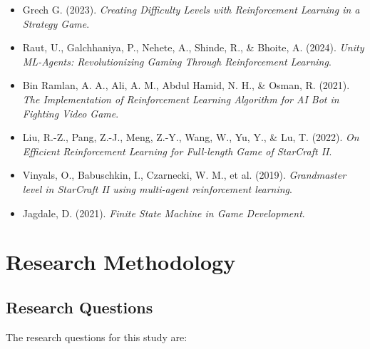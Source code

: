 \documentclass[conference]{IEEEtran}
\begin{document}
\begin{itemize}
	\item Grech G. (2023). \textit{Creating Difficulty Levels with Reinforcement Learning in a Strategy Game}. \cite{grech_creating_2023}
	\item Raut, U., Galchhaniya, P., Nehete, A., Shinde, R., \& Bhoite, A. (2024). \textit{Unity ML-Agents: Revolutionizing Gaming Through Reinforcement Learning}. \cite{raut_unity_2024}
	\item Bin Ramlan, A. A., Ali, A. M., Abdul Hamid, N. H., \& Osman, R. (2021). \textit{The Implementation of Reinforcement Learning Algorithm for AI Bot in Fighting Video Game}. \cite{bin_ramlan_implementation_2021}
	\item Liu, R.-Z., Pang, Z.-J., Meng, Z.-Y., Wang, W., Yu, Y., \& Lu, T. (2022). \textit{On Efficient Reinforcement Learning for Full-length Game of StarCraft II}. \cite{liu_efficient_2022}
	\item Vinyals, O., Babuschkin, I., Czarnecki, W. M., et al. (2019). \textit{Grandmaster level in StarCraft II using multi-agent reinforcement learning}. \cite{vinyals_grandmaster_2019}
	\item Jagdale, D. (2021). \textit{Finite State Machine in Game Development}. \cite{jagdale_finite_2021}
\end{itemize}

\section{Research Methodology}

\subsection{Research Questions}
The research questions for this study are:
\end{document}
